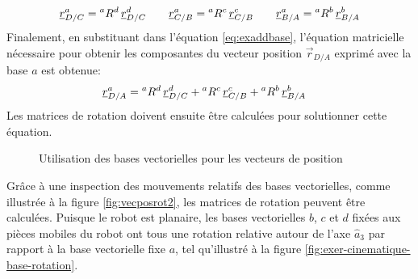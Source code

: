 \begin{example}
\begin{align}
\underline{r}_{D/C}^a = {}^aR^d \, \underline{r}_{D/C}^d 
\quad \quad
\underline{r}_{C/B}^a = {}^aR^c \, \underline{r}_{C/B}^c
\quad \quad
\underline{r}_{B/A}^a = {}^aR^b \, \underline{r}_{B/A}^b
\end{align} 
Finalement, en substituant dans l'équation \eqref{eq:exaddbase}, l'équation matricielle nécessaire pour obtenir les composantes du vecteur position $\vec{r}_{D/A}$ exprimé avec la base $a$ est obtenue:
\begin{align}
\underline{r}_{D/A}^a &= {}^aR^d \, \underline{r}_{D/C}^d + {}^aR^c \, \underline{r}_{C/B}^c + {}^aR^b \, \underline{r}_{B/A}^b
\label{eq:ex333cinematique}
\end{align} 
Les matrices de rotation doivent ensuite être calculées pour solutionner cette équation.
\begin{figure}[H]
        \centering
				\hspace{10pt}
				\hspace{10pt}
        \caption{Utilisation des bases vectorielles pour les vecteurs de position}
				\label{fig:vecposrot}
\end{figure}
Grâce à une inspection des mouvements relatifs des bases vectorielles, comme illustrée à la figure \ref{fig:vecposrot2}, les matrices de rotation peuvent être calculées. Puisque le robot est planaire, les bases vectorielles $b$, $c$ et $d$ fixées aux pièces mobiles du robot ont tous une rotation relative autour de l'axe $\hat{a}_3$ par rapport à la base vectorielle fixe $a$, tel qu'illustré à la figure \ref{fig:exer-cinematique-base-rotation}.  
%
\begin{figure}[H]
        \centering
				\hspace{10pt}

\end{figure}
\end{example}

